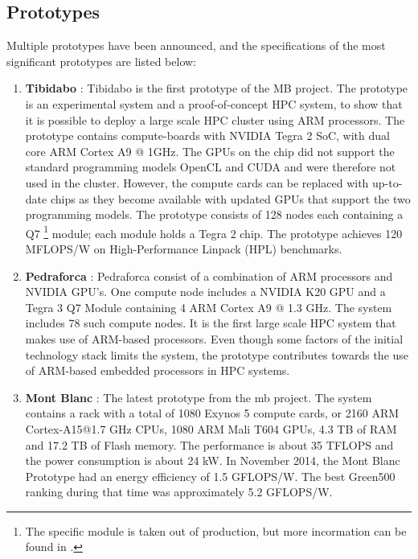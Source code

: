 \subsection{Prototypes}
Multiple prototypes have been announced, and the specifications of the most significant prototypes are listed below:
\begin{enumerate}
\item \textbf{Tibidabo} \cite{a:MB:Tib}: Tibidabo is the first prototype of the MB project. The prototype is an experimental system and a proof-of-concept HPC system, to show that it is possible to deploy a large scale HPC cluster using ARM processors. The prototype contains compute-boards with NVIDIA Tegra 2 SoC, with dual core ARM Cortex A9 @ 1GHz. The GPUs on the chip did not support the standard programming models OpenCL and CUDA and were therefore not used in the cluster. However, the compute cards can be replaced with up-to-date chips as they become available with updated GPUs that support the two programming models. The prototype consists of 128 nodes each containing a Q7 \footnote{The specific module is taken out of production, but more incormation can be found in \cite{a:MB:Tib}.} module; each module holds a Tegra 2 chip. The prototype achieves 120 MFLOPS/W on High-Performance Linpack (HPL) benchmarks.
\item \textbf{Pedraforca} \cite{p:MB:Pedr}: Pedraforca consist of a combination of ARM processors and NVIDIA GPU’s. One compute node includes a NVIDIA K20 GPU and a Tegra 3 Q7 Module containing 4 ARM Cortex A9 @ 1.3 GHz. The system includes 78 such compute nodes. It is the first large scale HPC system that makes use of ARM-based processors. Even though some factors of the initial technology stack limits the system, the prototype contributes towards the use of ARM-based embedded processors in HPC systems.
\item \textbf{Mont Blanc} \cite{p:MB:MB-prot, p:MB-15}: The latest prototype from the \gls{mb} project. The system contains a rack with a total of 1080 Exynos 5 compute cards, or 2160 ARM Cortex-A15@1.7 GHz CPUs, 1080 ARM Mali T604 GPUs, 4.3 TB of RAM and 17.2 TB of Flash memory. The performance is about 35 TFLOPS and the power consumption is about 24 kW. In November 2014, the Mont Blanc Prototype had an energy efficiency of 1.5 GFLOPS/W. The best Green500 ranking during that time was approximately 5.2 GFLOPS/W.
\end{enumerate}


